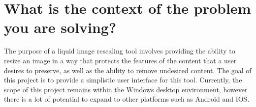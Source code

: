 \documentclass[a4paper]{article}
\begin{document}
\section{What is the context of the problem you are solving?}

The purpose of a liquid image rescaling tool involves providing the ability to resize an image in a
way that protects the features of the content that a user desires to preserve, as well as the
ability to remove undesired content. The goal of this project is to provide a simplistic user
interface for this tool. Currently, the scope of this project remains within the Windows desktop
environment, however there is a lot of potential to expand to other platforms such as Android and IOS.
\end{document}
